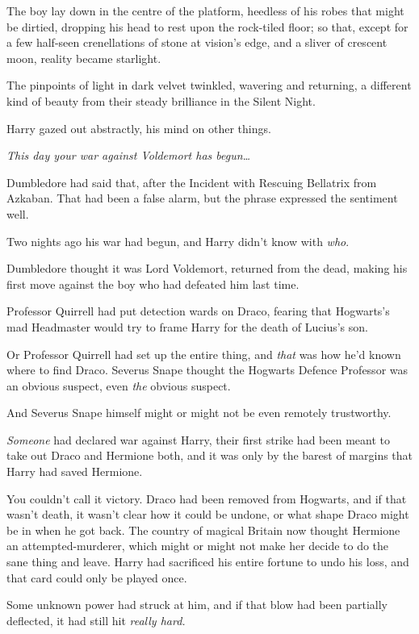 The boy lay down in the centre of the platform, heedless of his robes that might be dirtied, dropping his head to rest upon the rock-tiled floor; so that, except for a few half-seen crenellations of stone at vision’s edge, and a sliver of crescent moon, reality became starlight.

The pinpoints of light in dark velvet twinkled, wavering and returning, a different kind of beauty from their steady brilliance in the Silent Night.

Harry gazed out abstractly, his mind on other things.

\emph{This day your war against Voldemort has begun…}

Dumbledore had said that, after the Incident with Rescuing Bellatrix from Azkaban. That had been a false alarm, but the phrase expressed the sentiment well.

Two nights ago his war had begun, and Harry didn’t know with \emph{who}.

Dumbledore thought it was Lord Voldemort, returned from the dead, making his first move against the boy who had defeated him last time.

Professor Quirrell had put detection wards on Draco, fearing that Hogwarts’s mad Headmaster would try to frame Harry for the death of Lucius’s son.

Or Professor Quirrell had set up the entire thing, and \emph{that} was how he’d known where to find Draco. Severus Snape thought the Hogwarts Defence Professor was an obvious suspect, even \emph{the} obvious suspect.

And Severus Snape himself might or might not be even remotely trustworthy.

\emph{Someone} had declared war against Harry, their first strike had been meant to take out Draco and Hermione both, and it was only by the barest of margins that Harry had saved Hermione.

You couldn’t call it victory. Draco had been removed from Hogwarts, and if that wasn’t death, it wasn’t clear how it could be undone, or what shape Draco might be in when he got back. The country of magical Britain now thought Hermione an attempted-murderer, which might or might not make her decide to do the sane thing and leave. Harry had sacrificed his entire fortune to undo his loss, and that card could only be played once.

Some unknown power had struck at him, and if that blow had been partially deflected, it had still hit \emph{really hard.}

